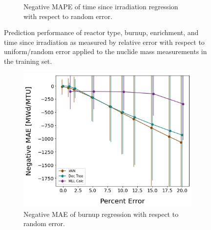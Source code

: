 \begin{figure}[!htb]
\begin{subfigure}[b]{0.49\textwidth}
    \caption{Negative \gls{MAPE} of time since irradiation regression with 
             respect to random error.} 
    \label{fig:randerrD}
  \end{subfigure}
  \caption{Prediction performance of reactor type, burnup, enrichment, and 
           time since irradiation as measured by relative error with respect 
           to uniform/random error applied to the nuclide mass measurements 
           in the training set.}
  \label{fig:randerr}
\end{figure}

\begin{figure}[!htb]
  \centering
  \begin{subfigure}[b]{0.49\textwidth}
    \centering
    \includegraphics[width=\textwidth]{./chapters/exp1/randerr_compare_nuc29_MAE_burn.png}
    \caption{Negative \gls{MAE} of burnup regression with respect to 
             random error.}
    \label{fig:randmaeA}
  \end{subfigure}
  \hfill
  \begin{subfigure}[b]{0.49\textwidth}
    \centering

\end{subfigure}
\end{figure}
